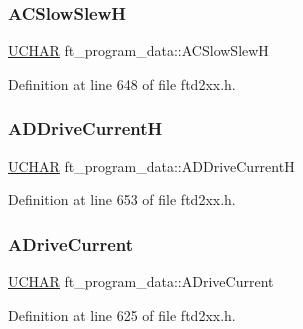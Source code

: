 \subsubsection{\texorpdfstring{A\+C\+Slow\+SlewH}{ACSlowSlewH}}
{\footnotesize\ttfamily \hyperlink{CatCaloProto40MHz_2inc_2WinTypes_8h_a4f4bb67531a9bf6f0b9c6ad76aeba587}{U\+C\+H\+AR} ft\+\_\+program\+\_\+data\+::\+A\+C\+Slow\+SlewH}



Definition at line 648 of file ftd2xx.\+h.

\mbox{\label{structft__program__data_acbb0755968deda2992031f7d1b99e1a7}} 
\subsubsection{\texorpdfstring{A\+D\+Drive\+CurrentH}{ADDriveCurrentH}}
{\footnotesize\ttfamily \hyperlink{CatCaloProto40MHz_2inc_2WinTypes_8h_a4f4bb67531a9bf6f0b9c6ad76aeba587}{U\+C\+H\+AR} ft\+\_\+program\+\_\+data\+::\+A\+D\+Drive\+CurrentH}



Definition at line 653 of file ftd2xx.\+h.

\mbox{\label{structft__program__data_a0c568765a812cf9f2e0681ffb6618943}} 
\subsubsection{\texorpdfstring{A\+Drive\+Current}{ADriveCurrent}}
{\footnotesize\ttfamily \hyperlink{CatCaloProto40MHz_2inc_2WinTypes_8h_a4f4bb67531a9bf6f0b9c6ad76aeba587}{U\+C\+H\+AR} ft\+\_\+program\+\_\+data\+::\+A\+Drive\+Current}



Definition at line 625 of file ftd2xx.\+h.

\mbox{\label{structft__program__data_a6e03913656e3e15d33ec5b1620e5df15}} 
